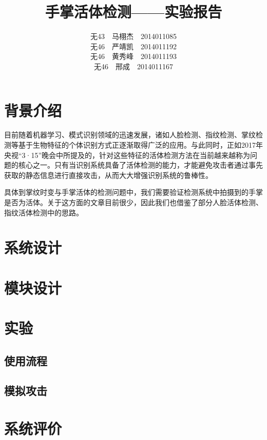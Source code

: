 \documentclass[UTF8]{ctexart}
\begin{document}
\title{手掌活体检测——实验报告}
\author{无43\ \ 马栩杰\ \ 2014011085\\ 无46\ \ 严靖凯\ \ 2014011192\\ 无46\ \ 黄秀峰\ \ 2014011193\\ 无46\ \ 邢成\ \ 2014011167}
\maketitle

\section{背景介绍}

目前随着机器学习、模式识别领域的迅速发展，诸如人脸检测、指纹检测、掌纹检测等基于生物特征的个体识别方式正逐渐取得广泛的应用。与此同时，正如2017年央视“3·15”晚会中所提及的，针对这些特征的活体检测方法在当前越来越称为问题的核心之一。只有当识别系统具备了活体检测的能力，才能避免攻击者通过事先获取的静态信息进行直接攻击，从而大大增强识别系统的鲁棒性。

具体到掌纹时变与手掌活体的检测问题中，我们需要验证检测系统中拍摄到的手掌是否为活体。关于这方面的文章目前很少，因此我们也借鉴了部分人脸活体检测、指纹活体检测中的思路。

\section{系统设计}


\section{模块设计}


\section{实验}

    \subsection{使用流程}

    \subsection{模拟攻击}

\section{系统评价}
\end{document}
